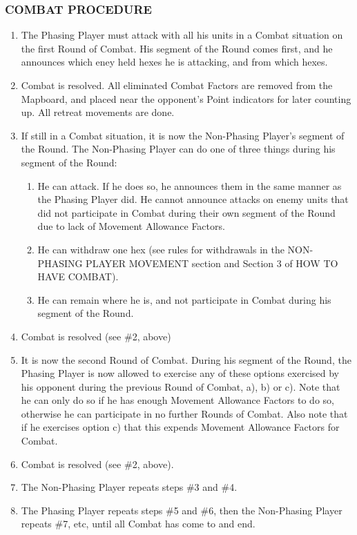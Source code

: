 \subsubsection{COMBAT PROCEDURE}

\begin{enumerate}
  \item The Phasing Player must attack with all his units in a Combat situation on the first Round of Combat. His segment of the Round comes first, and he announces which eney held hexes he is attacking, and from which hexes.

  \item Combat is resolved. All eliminated Combat Factors are removed from the Mapboard, and placed near the opponent's Point indicators for later counting up. All retreat movements are done.

  \item If still in a Combat situation, it is now the Non-Phasing Player's segment of the Round. The Non-Phasing Player can do one of three things during his segment of the Round:

  \begin{enumerate}[label=\alph*)]
    \item He can attack. If he does so, he announces them in the same manner as the Phasing Player did. He cannot announce attacks on enemy units that did not participate in Combat during their own segment of the Round due to lack of Movement Allowance Factors.

    \item He can withdraw one hex (see rules for withdrawals in the NON-PHASING PLAYER MOVEMENT section and Section 3 of HOW TO HAVE COMBAT).

    \item He can remain where he is, and not participate in Combat during his segment of the Round.
  \end{enumerate}

  \item Combat is resolved (see \#2, above)

  \item It is now the second Round of Combat. During his segment of the Round, the Phasing Player is now allowed to exercise any of these options exercised by his opponent during the previous Round of Combat, a), b) or c). Note that he can only do so if he has enough Movement Allowance Factors to do so, otherwise he can participate in no further Rounds of Combat. Also note that if he exercises option c) that this expends Movement Allowance Factors for Combat.

  \item Combat is resolved (see \#2, above).

  \item The Non-Phasing Player repeats steps \#3 and \#4.

  \item The Phasing Player repeats steps \#5 and \#6, then the Non-Phasing Player repeats \#7, etc, until all Combat has come to and end.
\end{enumerate}

